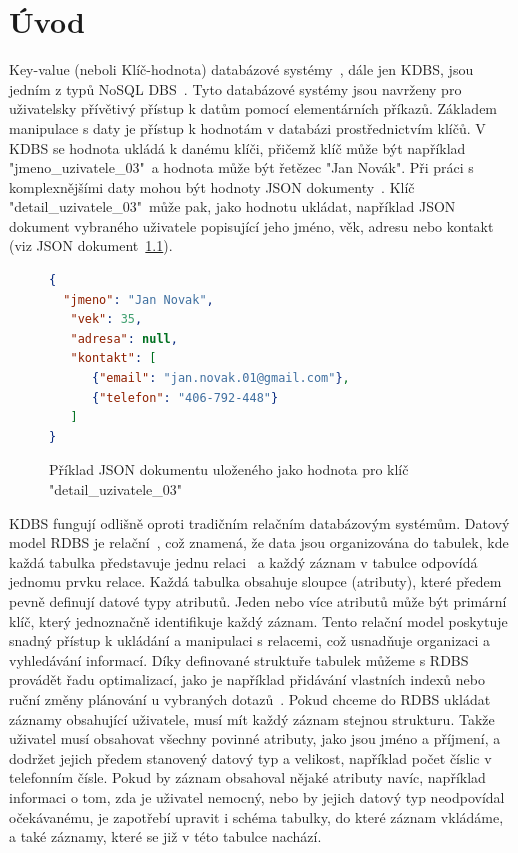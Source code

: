\documentclass[czech,master,dept460,male,csharp,cpdeclaration]{diploma}
\begin{document}
	
	\MakeTitlePages
	
	\listoffigures
	\listoftables
	
	\chapter{Úvod}
	
	Key-value (neboli Klíč-hodnota) databázové systémy~\cite{amaz-key-value-db, ytb-nosql-db}, dále jen KDBS, jsou jedním z typů NoSQL DBS~\cite{nosql}. Tyto databázové systémy jsou navrženy pro uživatelsky přívětivý přístup k datům pomocí elementárních příkazů. Základem manipulace s daty je přístup k hodnotám v databázi prostřednictvím klíčů. V KDBS se hodnota ukládá k danému klíči, přičemž klíč může být například "jmeno\_uzivatele\_03"~a hodnota může být řetězec "Jan Novák". Při práci s komplexnějšími daty mohou být hodnoty JSON dokumenty~\cite{json}. Klíč "detail\_uzivatele\_03"~může pak, jako hodnotu ukládat, například JSON dokument vybraného uživatele popisující jeho jméno, věk, adresu nebo kontakt (viz JSON dokument~\ref{json-hodnota}).
	
	\begin{figure}
	\centering
	\begin{lstlisting}[language=json,firstnumber=1]
{
  "jmeno": "Jan Novak",
   "vek": 35,
   "adresa": null,
   "kontakt": [
      {"email": "jan.novak.01@gmail.com"},
      {"telefon": "406-792-448"}
   ]
}
	\end{lstlisting}
	\caption{Příklad JSON dokumentu uloženého jako hodnota pro klíč "detail\_uzivatele\_03"}
	\label{json-hodnota}
	\end{figure}	
	
	KDBS fungují odlišně oproti tradičním relačním databázovým systémům. Datový model RDBS je relační~\cite{rdbs}, což znamená, že data jsou organizována do tabulek, kde každá tabulka představuje jednu relaci~\cite{relace} a každý záznam v tabulce odpovídá jednomu prvku relace. Každá tabulka obsahuje sloupce (atributy), které předem pevně definují datové typy atributů. Jeden nebo více atributů může být primární klíč, který jednoznačně identifikuje každý záznam. Tento relační model poskytuje snadný přístup k ukládání a manipulaci s relacemi, což usnadňuje organizaci a vyhledávání informací. Díky definované struktuře tabulek můžeme s RDBS provádět řadu optimalizací, jako je například přidávání vlastních indexů nebo ruční změny plánování u vybraných dotazů~\cite{rdbs-optimalizace}. Pokud chceme do RDBS ukládat záznamy obsahující uživatele, musí mít každý záznam stejnou strukturu. Takže uživatel musí obsahovat všechny povinné atributy, jako jsou jméno a příjmení, a dodržet jejich předem stanovený datový typ a velikost, například počet číslic v telefonním čísle. Pokud by záznam obsahoval nějaké atributy navíc, například informaci o tom, zda je uživatel nemocný, nebo by jejich datový typ neodpovídal očekávanému, je zapotřebí upravit i schéma tabulky, do které záznam vkládáme, a také záznamy, které se již v této tabulce nachází.
	
\end{document}
